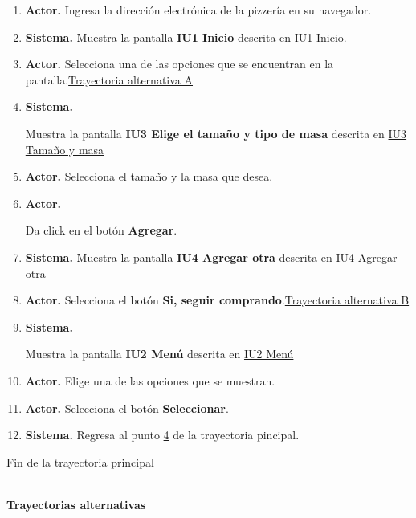 		\begin{enumerate}
			\item {\textbf{Actor.}} Ingresa la dirección electrónica de la pizzería en su navegador.
			\item \textbf{Sistema.} Muestra la pantalla \textbf{IU1 Inicio} descrita en \hyperlink{IU1}{IU1 Inicio}.
			\item \textbf{Actor.} Selecciona una de las opciones que se encuentran en la pantalla.\hyperlink{CU1:TAA}{Trayectoria alternativa A}
			\item \hypertarget{CU1:TP:P4}{\textbf{Sistema.}} Muestra la pantalla  \textbf{IU3 Elige el tamaño y tipo de masa} descrita en \hyperlink{IU3}{IU3 Tamaño y masa}
			\item \textbf{Actor.} Selecciona el tamaño y la masa que desea.
			\item  \hypertarget{CU1:TP:P6}{\textbf{Actor.}} Da click en el botón \textbf{Agregar}.
			\item \textbf{Sistema.} Muestra la pantalla  \textbf{IU4 Agregar otra} descrita en \hyperlink{IU4}{IU4 Agregar otra}
			\item \textbf{Actor.} Selecciona el botón \textbf{Si, seguir comprando}.\hyperlink{CU1:TAB}{Trayectoria alternativa B}
			\item \hypertarget{CU1:TP:P9} {\textbf{Sistema.}} Muestra la pantalla \textbf{IU2 Menú} descrita en \hyperlink{IU2}{IU2 Menú}
			\item \textbf{Actor.} Elige una de las opciones que se muestran.
			\item \textbf{Actor.} Selecciona el botón \textbf{Seleccionar}. 
			\item \textbf{Sistema.} Regresa al punto \hyperlink{CU1:TP:P4}{4} de la trayectoria pincipal.
		\end{enumerate}
			
		Fin de la trayectoria principal

	\noindent \textbf{\\Trayectorias alternativas}

